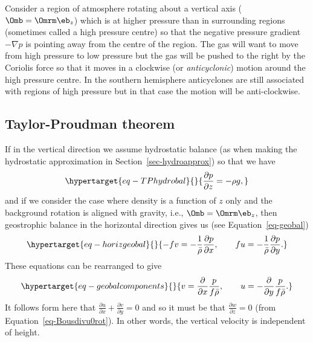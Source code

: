 \documentclass[
  letterpaper,
  twocolumn,
  landscape]{report}
\begin{document}
\begin{tcolorbox}[enhanced jigsaw, left=2mm, opacityback=0, coltitle=black, bottomtitle=1mm, title={Example}, toprule=.15mm, colbacktitle=quarto-callout-tip-color!10!white, breakable, arc=.35mm, titlerule=0mm, colback=white, toptitle=1mm, opacitybacktitle=0.6, rightrule=.15mm, bottomrule=.15mm, colframe=quarto-callout-tip-color-frame, leftrule=.75mm]

Consider a region of atmosphere rotating about a vertical axis
(\(\Omb = \Omrm \eb_z\)) which is at higher pressure than in surrounding
regions (sometimes called a high pressure centre) so that the negative
pressure gradient \(-\nabla p\) is pointing away from the centre of the
region. The gas will want to move from high pressure to low pressure but
the gas will be pushed to the right by the Coriolis force so that it
moves in a clockwise (or \emph{anticyclonic}) motion around the high
pressure centre. In the southern hemisphere anticyclones are still
associated with regions of high pressure but in that case the motion
will be anti-clockwise.

\end{tcolorbox}

\hypertarget{taylor-proudman-theorem}{%
\subsection{Taylor-Proudman theorem}\label{taylor-proudman-theorem}}

If in the vertical direction we assume hydrostatic balance (as when
making the hydrostatic approximation in Section~\ref{sec-hydroapprox})
so that we have \begin{equation}\protect\hypertarget{eq-TPhydrobal}{}{
\frac{\partial p}{\partial z} = -\rho g,
}\label{eq-TPhydrobal}\end{equation} and if we consider the case where
density is a function of \(z\) only and the background rotation is
aligned with gravity, i.e., \(\Omb=\Omrm \eb_z\), then geostrophic
balance in the horizontal direction gives us (see
Equation~\ref{eq-geobal})
\begin{equation}\protect\hypertarget{eq-horizgeobal}{}{
-f v = -\frac{1}{\bar\rho}\frac{\partial p}{\partial x}, \quad \quad f u = -\frac{1}{\bar\rho}\frac{\partial p}{\partial y}.
}\label{eq-horizgeobal}\end{equation} These equations can be rearranged
to give \begin{equation}\protect\hypertarget{eq-geobalcomponents}{}{
 v = \frac{\partial}{\partial x}\frac{p}{f\bar\rho}, \quad \quad u = -\frac{\partial}{\partial y}\frac{p}{f\bar\rho}.
}\label{eq-geobalcomponents}\end{equation} It follows form here that
\(\frac{\partial u}{\partial x} + \frac{\partial v}{\partial y} = 0\)
and so it must be that \(\frac{\partial w}{\partial z}=0\) (from
Equation~\ref{eq-Bousdivu0rot}). In other words, the vertical velocity
is independent of height.
\end{document}
